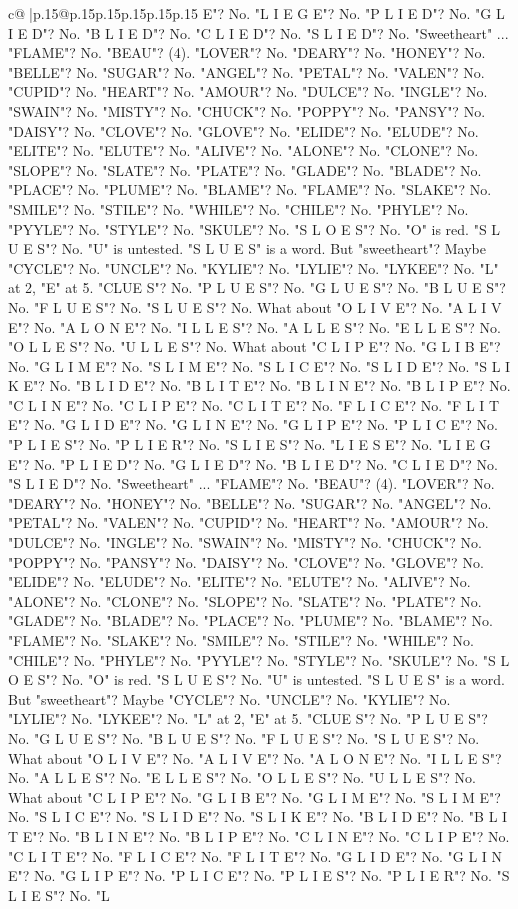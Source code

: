 \documentclass{article}
\begin{document}
{\begin{supertabular}{c@{$\;$}|p{.15\linewidth}@{}p{.15\linewidth}p{.15\linewidth}p{.15\linewidth}p{.15\linewidth}p{.15\linewidth}}
{{{E"? No. "L I E G E"? No. "P L I E D"? No. "G L I E D"? No. "B L I E D"? No. "C L I E D"? No. "S L I E D"? No. "Sweetheart" ... "FLAME"? No. "BEAU"? (4). "LOVER"? No. "DEARY"? No. "HONEY"? No. "BELLE"? No. "SUGAR"? No. "ANGEL"? No. "PETAL"? No. "VALEN"? No. "CUPID"? No. "HEART"? No. "AMOUR"? No. "DULCE"? No. "INGLE"? No. "SWAIN"? No. "MISTY"? No. "CHUCK"? No. "POPPY"? No. "PANSY"? No. "DAISY"? No. "CLOVE"? No. "GLOVE"? No. "ELIDE"? No. "ELUDE"? No. "ELITE"? No. "ELUTE"? No. "ALIVE"? No. "ALONE"? No. "CLONE"? No. "SLOPE"? No. "SLATE"? No. "PLATE"? No. "GLADE"? No. "BLADE"? No. "PLACE"? No. "PLUME"? No. "BLAME"? No. "FLAME"? No. "SLAKE"? No. "SMILE"? No. "STILE"? No. "WHILE"? No. "CHILE"? No. "PHYLE"? No. "PYYLE"? No. "STYLE"? No. "SKULE"? No. "S L O E S"? No. "O" is red. "S L U E S"? No. "U" is untested. "S L U E S" is a word. But "sweetheart"? Maybe "CYCLE"? No. "UNCLE"? No. "KYLIE"? No. "LYLIE"? No. "LYKEE"? No. "L" at 2, "E" at 5. "CLUE S"? No. "P L U E S"? No. "G L U E S"? No. "B L U E S"? No. "F L U E S"? No. "S L U E S"? No. What about "O L I V E"? No. "A L I V E"? No. "A L O N E"? No. "I L L E S"? No. "A L L E S"? No. "E L L E S"? No. "O L L E S"? No. "U L L E S"? No. What about "C L I P E"? No. "G L I B E"? No. "G L I M E"? No. "S L I M E"? No. "S L I C E"? No. "S L I D E"? No. "S L I K E"? No. "B L I D E"? No. "B L I T E"? No. "B L I N E"? No. "B L I P E"? No. "C L I N E"? No. "C L I P E"? No. "C L I T E"? No. "F L I C E"? No. "F L I T E"? No. "G L I D E"? No. "G L I N E"? No. "G L I P E"? No. "P L I C E"? No. "P L I E S"? No. "P L I E R"? No. "S L I E S"? No. "L I E S E"? No. "L I E G E"? No. "P L I E D"? No. "G L I E D"? No. "B L I E D"? No. "C L I E D"? No. "S L I E D"? No. "Sweetheart" ... "FLAME"? No. "BEAU"? (4). "LOVER"? No. "DEARY"? No. "HONEY"? No. "BELLE"? No. "SUGAR"? No. "ANGEL"? No. "PETAL"? No. "VALEN"? No. "CUPID"? No. "HEART"? No. "AMOUR"? No. "DULCE"? No. "INGLE"? No. "SWAIN"? No. "MISTY"? No. "CHUCK"? No. "POPPY"? No. "PANSY"? No. "DAISY"? No. "CLOVE"? No. "GLOVE"? No. "ELIDE"? No. "ELUDE"? No. "ELITE"? No. "ELUTE"? No. "ALIVE"? No. "ALONE"? No. "CLONE"? No. "SLOPE"? No. "SLATE"? No. "PLATE"? No. "GLADE"? No. "BLADE"? No. "PLACE"? No. "PLUME"? No. "BLAME"? No. "FLAME"? No. "SLAKE"? No. "SMILE"? No. "STILE"? No. "WHILE"? No. "CHILE"? No. "PHYLE"? No. "PYYLE"? No. "STYLE"? No. "SKULE"? No. "S L O E S"? No. "O" is red. "S L U E S"? No. "U" is untested. "S L U E S" is a word. But "sweetheart"? Maybe "CYCLE"? No. "UNCLE"? No. "KYLIE"? No. "LYLIE"? No. "LYKEE"? No. "L" at 2, "E" at 5. "CLUE S"? No. "P L U E S"? No. "G L U E S"? No. "B L U E S"? No. "F L U E S"? No. "S L U E S"? No. What about "O L I V E"? No. "A L I V E"? No. "A L O N E"? No. "I L L E S"? No. "A L L E S"? No. "E L L E S"? No. "O L L E S"? No. "U L L E S"? No. What about "C L I P E"? No. "G L I B E"? No. "G L I M E"? No. "S L I M E"? No. "S L I C E"? No. "S L I D E"? No. "S L I K E"? No. "B L I D E"? No. "B L I T E"? No. "B L I N E"? No. "B L I P E"? No. "C L I N E"? No. "C L I P E"? No. "C L I T E"? No. "F L I C E"? No. "F L I T E"? No. "G L I D E"? No. "G L I N E"? No. "G L I P E"? No. "P L I C E"? No. "P L I E S"? No. "P L I E R"? No. "S L I E S"? No. "L }}}
\end{supertabular}}
\end{document}
